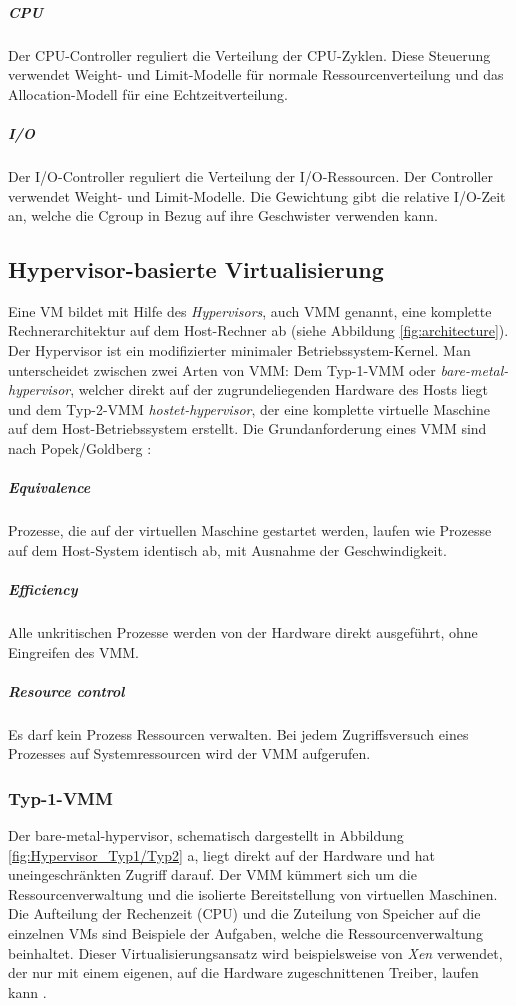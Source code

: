 \subparagraph{CPU}
Der CPU-Controller reguliert die Verteilung der CPU-Zyklen. Diese Steuerung verwendet Weight- und Limit-Modelle für normale Ressourcenverteilung und das Allocation-Modell für eine Echtzeitverteilung.

\subparagraph{I/O}
Der I/O-Controller reguliert die Verteilung der I/O-Ressourcen. Der Controller verwendet Weight- und Limit-Modelle. Die Gewichtung gibt die relative I/O-Zeit an, welche die Cgroup in Bezug auf ihre Geschwister verwenden kann.

\subsection{Hypervisor-basierte Virtualisierung}
Eine \ac{VM} bildet mit Hilfe des \emph{Hypervisors}, auch \ac{VMM} genannt, eine komplette Rechnerarchitektur auf dem Host-Rechner ab (siehe Abbildung \ref{fig:architecture}). Der Hypervisor ist ein modifizierter minimaler Betriebssystem-Kernel. Man unterscheidet zwischen zwei Arten von VMM: Dem Typ-1-VMM oder \emph{bare-metal-hypervisor}, welcher direkt auf der zugrundeliegenden Hardware des Hosts liegt und dem Typ-2-VMM \emph{hostet-hypervisor}, der eine komplette virtuelle Maschine auf dem Host-Betriebssystem erstellt. Die Grundanforderung eines VMM sind nach Popek/Goldberg \cite{Popek1974FormalArchitectures,Glatz2015Betriebssysteme}:


 \subparagraph{Equivalence} 
 Prozesse, die auf der virtuellen Maschine gestartet werden, laufen wie Prozesse auf dem  Host-System identisch ab, mit Ausnahme der Geschwindigkeit. 
 
\subparagraph{Efficiency} 
Alle unkritischen Prozesse werden von der Hardware direkt ausgeführt, ohne Eingreifen des VMM.

\subparagraph{Resource control} 
Es darf kein Prozess Ressourcen verwalten. Bei jedem Zugriffsversuch eines Prozesses auf Systemressourcen wird der VMM aufgerufen.



\subsubsection{Typ-1-VMM}
Der bare-metal-hypervisor, schematisch dargestellt in Abbildung \ref{fig:Hypervisor_Typ1/Typ2} a, liegt direkt auf der Hardware und hat uneingeschränkten Zugriff darauf. Der VMM kümmert sich um die Ressourcenverwaltung und die isolierte Bereitstellung von virtuellen Maschinen. Die Aufteilung der Rechenzeit (CPU) und die Zuteilung von Speicher auf die einzelnen VMs sind Beispiele der Aufgaben, welche die Ressourcenverwaltung beinhaltet. Dieser Virtualisierungsansatz wird beispielsweise von \emph{Xen} \cite{Install2018XenArchitecture} verwendet,  der nur mit einem eigenen, auf die Hardware zugeschnittenen Treiber, laufen kann \cite{Glatz2015Betriebssysteme}.

